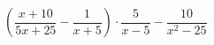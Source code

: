 \begin{ex}[type=expression]
	\begin{condition}
		\( \left( \dfrac{x+10}{5x+25} -\dfrac{1}{x+5}\right) \cdot\dfrac{5}{x-5}-\dfrac{10}{x^2-25}\)
	\end{condition}
\end{ex}
